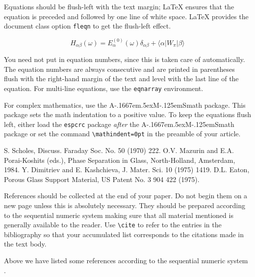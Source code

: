 \documentclass[fleqn,twoside]{article}
\newcommand{\AmS}{{\protect\the\textfont2
  A\kern-.1667em\lower.5ex\hbox{M}\kern-.125emS}}
\begin{document}
Equations should be flush-left with the text margin; \LaTeX{} ensures
that the equation is preceded and followed by one line of white space.
\LaTeX{} provides the document class option {\tt fleqn} to get the
flush-left effect.

\begin{equation}
H_{\alpha\beta}(\omega) = E_\alpha^{(0)}(\omega) \delta_{\alpha\beta} +
                          \langle \alpha | W_\pi | \beta \rangle 
\end{equation}

You need not put in equation numbers, since this is taken care of
automatically. The equation numbers are always consecutive and are
printed in parentheses flush with the right-hand margin of the text and
level with the last line of the equation. For multi-line equations, use
the {\tt eqnarray} environment.

For complex mathematics, use the \AmS math package. This package
sets the math indentation to a positive value. To keep the equations
flush left, either load the \texttt{espcrc} package \emph{after} the
\AmS math package or set the command \verb|\mathindent=0pt| in the
preamble of your article.

\begin{thebibliography}{9}
 S. Scholes, Discuss. Faraday Soc. No. 50 (1970) 222.
 O.V. Mazurin and E.A. Porai-Koshits (eds.),
                 Phase Separation in Glass, North-Holland, Amsterdam, 1984.
 Y. Dimitriev and E. Kashchieva, 
                 J. Mater. Sci. 10 (1975) 1419.
 D.L. Eaton, Porous Glass Support Material,
                 US Patent No. 3 904 422 (1975).
\end{thebibliography}

References should be collected at the end of your paper. Do not begin
them on a new page unless this is absolutely necessary. They should be
prepared according to the sequential numeric system making sure that
all material mentioned is generally available to the reader. Use
\verb+\cite+ to refer to the entries in the bibliography so that your
accumulated list corresponds to the citations made in the text body. 

Above we have listed some references according to the
sequential numeric system \cite{Scho70,Mazu84,Dimi75,Eato75}.
\end{document}
